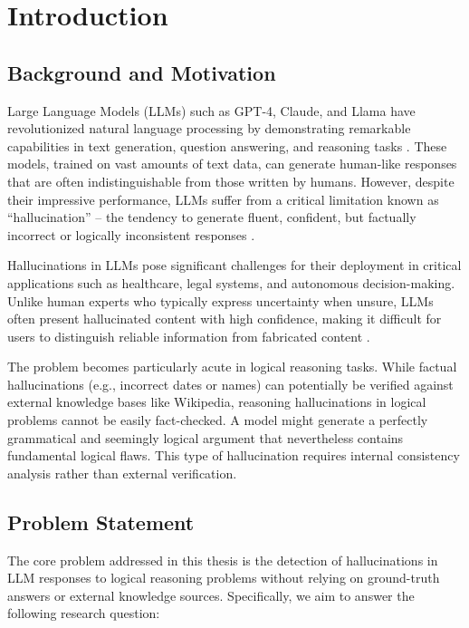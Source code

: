 \chapter{Introduction}

\section{Background and Motivation}

Large Language Models (LLMs) such as GPT-4, Claude, and Llama have revolutionized natural language processing by demonstrating remarkable capabilities in text generation, question answering, and reasoning tasks \cite{brown2020language}. These models, trained on vast amounts of text data, can generate human-like responses that are often indistinguishable from those written by humans. However, despite their impressive performance, LLMs suffer from a critical limitation known as ``hallucination'' -- the tendency to generate fluent, confident, but factually incorrect or logically inconsistent responses \cite{ji2023survey}.

Hallucinations in LLMs pose significant challenges for their deployment in critical applications such as healthcare, legal systems, and autonomous decision-making. Unlike human experts who typically express uncertainty when unsure, LLMs often present hallucinated content with high confidence, making it difficult for users to distinguish reliable information from fabricated content \cite{manakul2023selfcheckgpt}.

The problem becomes particularly acute in logical reasoning tasks. While factual hallucinations (e.g., incorrect dates or names) can potentially be verified against external knowledge bases like Wikipedia, reasoning hallucinations in logical problems cannot be easily fact-checked. A model might generate a perfectly grammatical and seemingly logical argument that nevertheless contains fundamental logical flaws. This type of hallucination requires internal consistency analysis rather than external verification.

\section{Problem Statement}

The core problem addressed in this thesis is the detection of hallucinations in LLM responses to logical reasoning problems without relying on ground-truth answers or external knowledge sources. Specifically, we aim to answer the following research question:

